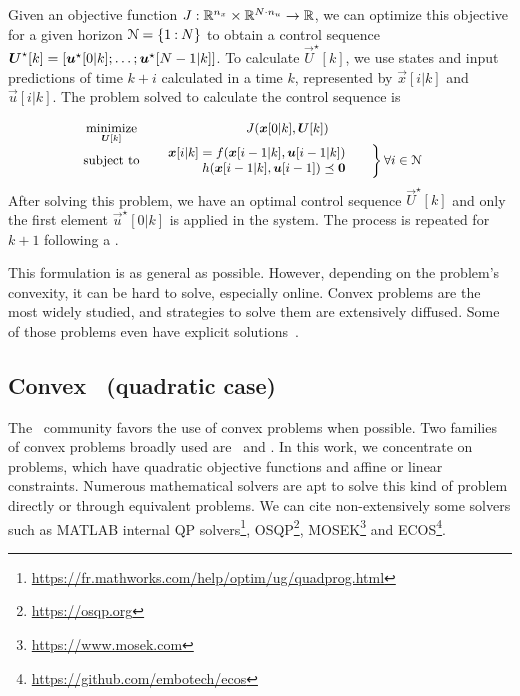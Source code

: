 \documentclass[../main.tex]{subfiles}
\begin{document}
Given an objective function ${J:\mathbb{R}^{n_{x}}\times\mathbb{R}^{N\cdot n_{u}}\to \mathbb{R}}$, we can optimize this objective for a given horizon $\mathcal{N}=\{1\mathbin{:}N\}$ to obtain a control sequence ${\boldsymbol{U}^{\star}[k]=[\boldsymbol{u}^{\star}[0|k];\dots; \boldsymbol{u}^{\star}[N-1|k]]}$. To calculate $\vec{U}^{\star}[k]$,
we use states and input predictions of time $k+i$ calculated in a time $k$, represented by $\vec{x}[i|k]$ and $\vec{u}[i|k]$. The problem solved to calculate the control sequence is

\begin{equation}\label{eq:general_mpc}
  \small
  \begin{aligned}
    \begin{matrix}
      \mathop{\textrm{minimize}}\limits_{\boldsymbol{U}[k]} & J(\boldsymbol{x}[0|k],\boldsymbol{U}[k])&\\
      \mathrm{subject~ to} &

      \left.  \begin{aligned}
          \quad \boldsymbol{x}[i|k]=f(\boldsymbol{x}[i-1|k],\boldsymbol{u}[i-1|k])\\
          \quad                h(\boldsymbol{x}[i-1|k],\boldsymbol{u}[i-1])\preceq\mathbf{0}
        \end{aligned}\qquad        \right\}

      \begin{aligned}
        \forall i\in\mathcal{N}
      \end{aligned}
    \end{matrix}
  \end{aligned}
\end{equation}
After solving this problem, we have an optimal control sequence $\vec{U}^{\star}[k]$ and only the first element $\vec{u}^{\star}[0|k]$ is applied in the system.
The process is repeated for ${k+1}$ following a \rhs.

This formulation is as general as possible.
However, depending on the problem's convexity, it can be hard to solve, especially online.
Convex problems are the most widely studied, and strategies to solve them are extensively diffused.
Some of those problems even have explicit solutions~\cite{BoydVandenberghe2004}.

\subsection{Convex \mpc\ (quadratic case) }\label{sec:qp_mpc}
The \mpc\ community favors the use of convex problems when possible. Two families of convex problems broadly used are \qp\ and \lp.
In this work, we concentrate on \qp{} problems, which have quadratic objective functions and affine or linear constraints.
Numerous mathematical solvers are apt to solve this kind of problem directly or through equivalent problems.
We can cite non-extensively some solvers such as MATLAB internal QP solvers\footnote{\url{https://fr.mathworks.com/help/optim/ug/quadprog.html}}, OSQP\footnote{\url{https://osqp.org}}, MOSEK\footnote{\url{https://www.mosek.com}} and ECOS\footnote{\url{https://github.com/embotech/ecos}}.
\end{document}
